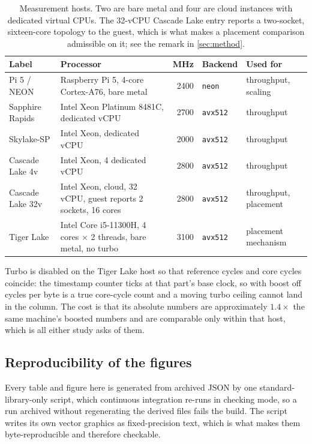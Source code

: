 \documentclass[acmsmall,screen,review]{acmart}
\theoremstyle{acmdefinition}
\newcommand{\code}[1]{\texttt{#1}}
\begin{document}
\begin{table}[t]
\centering
\caption{Measurement hosts. Two are bare metal and four are cloud instances with
dedicated virtual CPUs. The 32-vCPU Cascade Lake entry reports a two-socket,
sixteen-core topology to the guest, which is what makes a placement comparison
admissible on it; see the remark in \cref{sec:method}.}\label{tab:machines}
\footnotesize
\begin{tabularx}{\linewidth}{lXrll}
\toprule
Label & Processor & MHz & Backend & Used for \\
\midrule
Pi 5 / NEON       & Raspberry Pi 5, 4-core Cortex-A76, bare metal & 2400 & \code{neon}   & throughput, scaling \\
Sapphire Rapids   & Intel Xeon Platinum 8481C, dedicated vCPU     & 2700 & \code{avx512} & throughput \\
Skylake-SP        & Intel Xeon, dedicated vCPU                    & 2000 & \code{avx512} & throughput \\
Cascade Lake 4v   & Intel Xeon, 4 dedicated vCPU                  & 2800 & \code{avx512} & throughput \\
Cascade Lake 32v  & Intel Xeon, cloud, 32 vCPU, guest reports 2 sockets, 16 cores & 2800 & \code{avx512} & throughput, placement \\
Tiger Lake        & Intel Core i5-11300H, 4 cores $\times$ 2 threads, bare metal, no turbo & 3100 & \code{avx512} & placement mechanism \\
\bottomrule
\end{tabularx}
\end{table}

Turbo is disabled on the Tiger Lake host so that reference cycles and core
cycles coincide: the timestamp counter ticks at that part's base clock, so with
boost off cycles per byte is a true core-cycle count and a moving turbo ceiling
cannot land in the column. The cost is that its absolute numbers are
approximately $1.4\times$ the same machine's boosted numbers and are comparable
only within that host, which is all either study asks of them.

\subsection{Reproducibility of the figures}

Every table and figure here is generated from archived JSON by one
standard-library-only script, which continuous integration re-runs in checking
mode, so a run archived without regenerating the derived files fails the build.
The script writes its own vector graphics as fixed-precision text, which is what
makes them byte-reproducible and therefore checkable.
\end{document}
